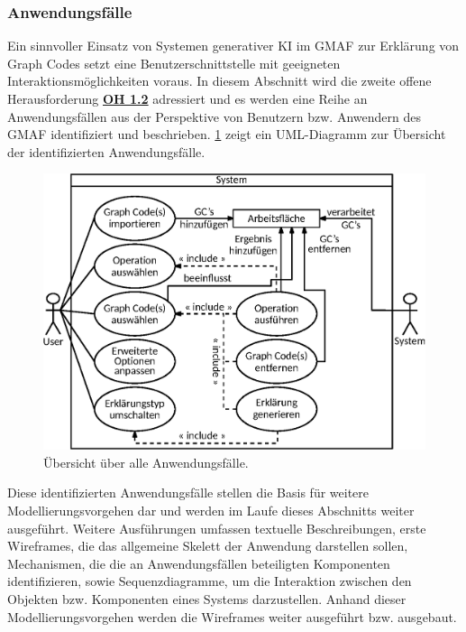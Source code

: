 \subsubsection{Anwendungsfälle}
\label{sec3:model:subsubsec:use-cases}
Ein sinnvoller Einsatz von Systemen generativer KI im GMAF zur Erklärung von Graph Codes setzt eine Benutzerschnittstelle mit geeigneten Interaktionsmöglichkeiten voraus.
In diesem Abschnitt wird die zweite offene Herausforderung \hyperref[sec2:sota:oi:1.2]{\textbf{OH 1.2}} adressiert und es werden eine Reihe an Anwendungsfällen aus der Perspektive von Benutzern bzw. Anwendern des GMAF identifiziert und beschrieben.
\cref{sec3:model:subsubsec:use-cases:fig:overview-use-cases} zeigt ein UML-Diagramm zur Übersicht der identifizierten Anwendungsfälle.
\begin{figure}[htb]
    \centering
    \includegraphics[width=\textwidth]{chapter/chapter_3/uml-explainer-system.eps}
    \caption{Übersicht über alle Anwendungsfälle.}
    \label{sec3:model:subsubsec:use-cases:fig:overview-use-cases}
\end{figure}
\noindent
Diese identifizierten Anwendungsfälle stellen die Basis für weitere Modellierungsvorgehen dar und werden im Laufe dieses Abschnitts weiter ausgeführt.
Weitere Ausführungen umfassen textuelle Beschreibungen, erste Wireframes, die das allgemeine Skelett der Anwendung darstellen sollen, Mechanismen, die die an Anwendungsfällen beteiligten Komponenten identifizieren, sowie Sequenzdiagramme, um die Interaktion zwischen den Objekten bzw. Komponenten eines Systems darzustellen.
Anhand dieser Modellierungsvorgehen werden die Wireframes weiter ausgeführt bzw. ausgebaut.

